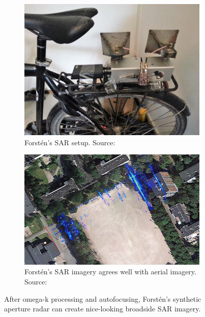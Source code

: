 \begin{figure}[htbp]
    \begin{subfigure}[t]{0.43330076762\textwidth}
        \centering
        \includegraphics[max width=\linewidth]{gfx/pictures/forsten_1.jpg}
        \caption{Forstén's SAR setup. Source: \cite{Forsten2015}}
        \label{fig:forsten_1}
    \end{subfigure}%
    \hfill%
    \begin{subfigure}[t]{0.51669923238\textwidth}
        \centering
        \includegraphics[max width=\linewidth]{gfx/pictures/forsten_2.jpg}
        \caption{Forstén's SAR imagery agrees well with aerial imagery. Source: \cite{Forsten2015}}
        \label{fig:forsten_2}
    \end{subfigure}
    \caption{After omega-k processing and autofocusing, Forstén's synthetic aperture radar can create nice-looking broadside SAR imagery.}
    \label{fig:forsten}
\end{figure}

